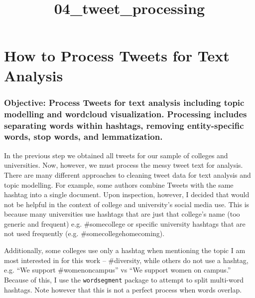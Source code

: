 \documentclass[11pt]{article}
\title{04\_tweet\_processing}
\begin{document}
    
    
    \maketitle
    
    

    
    \hypertarget{how-to-process-tweets-for-text-analysis}{%
\section{How to Process Tweets for Text
Analysis}\label{how-to-process-tweets-for-text-analysis}}

    \hypertarget{objective-process-tweets-for-text-analysis-including-topic-modelling-and-wordcloud-visualization.-processing-includes-separating-words-within-hashtags-removing-entity-specific-words-stop-words-and-lemmatization.}{%
\subsubsection{Objective: Process Tweets for text analysis including
topic modelling and wordcloud visualization. Processing includes
separating words within hashtags, removing entity-specific words, stop
words, and
lemmatization.}\label{objective-process-tweets-for-text-analysis-including-topic-modelling-and-wordcloud-visualization.-processing-includes-separating-words-within-hashtags-removing-entity-specific-words-stop-words-and-lemmatization.}}

    In the previous step we obtained all tweets for our sample of colleges
and universities. Now, however, we must process the messy tweet text for
analysis. There are many different approaches to cleaning tweet data for
text analysis and topic modelling. For example, some authors combine
Tweets with the same hashtag into a single document. Upon inspection,
however, I decided that would not be helpful in the context of college
and university's social media use. This is because many universities use
hashtags that are just that college's name (too generic and frequent)
e.g. \#somecollege or specific university hashtags that are not used
frequently (e.g. \#somecollegehomecoming).

Additionally, some colleges use only a hashtag when mentioning the topic
I am most interested in for this work -- \#diversity, while others do
not use a hashtag, e.g. ``We support \#womenoncampus'' vs ``We support
women on campus.'' Because of this, I use the \texttt{wordsegment}
package to attempt to split multi-word hashtags. Note however that this
is not a perfect process when words overlap.
\end{document}
